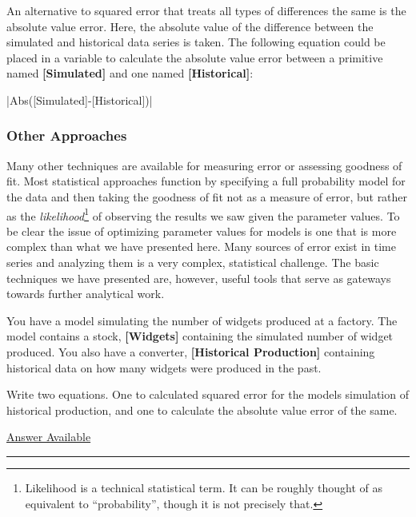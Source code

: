 \documentclass[]{memoir}
\newcommand{\FunctionTok}[1]{\textcolor[rgb]{0.02,0.16,0.49}{{#1}}}
\newcommand{\NormalTok}[1]{{#1}}
\newcommand{\p}[1]{\textbf{{[}#1{]}}}
\begin{document}
An alternative to squared error that treats all types of differences the
same is the absolute value error. Here, the absolute value of the
difference between the simulated and historical data series is taken.
The following equation could be placed in a variable to calculate the
absolute value error between a primitive named \p{Simulated} and one
named \p{Historical}:

|\FunctionTok{Abs}\NormalTok{([Simulated]-[Historical])}|

\subsubsection{Other Approaches}

Many other techniques are available for measuring error or assessing
goodness of fit. Most statistical approaches function by specifying a
full probability model for the data and then taking the goodness of fit
not as a measure of error, but rather as the \emph{likelihood}\footnote{Likelihood
  is a technical statistical term. It can be roughly thought of as
  equivalent to ``probability'', though it is not precisely that.} of
observing the results we saw given the parameter values. To be clear the
issue of optimizing parameter values for models is one that is more
complex than what we have presented here. Many sources of error exist in
time series and analyzing them is a very complex, statistical challenge.
The basic techniques we have presented are, however, useful tools that
serve as gateways towards further analytical work.


You have a model simulating the number of widgets produced at a factory.
The model contains a stock, \p{Widgets} containing the simulated number
of widget produced. You also have a converter, \p{Historical Production}
containing historical data on how many widgets were produced in the
past.

Write two equations. One to calculated squared error for the models
simulation of historical production, and one to calculate the absolute
value error of the same.

\hyperref[Ans-12-1]{Answer Available}

\begin{center}\rule{3in}{0.4pt}\end{center}
\end{document}
